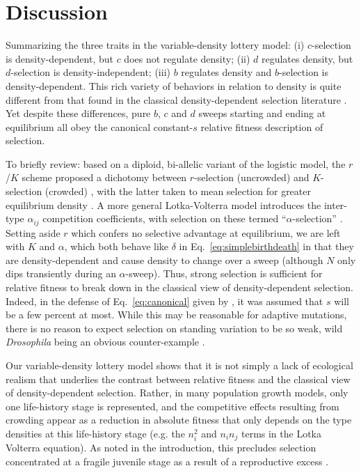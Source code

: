 \documentclass[12pt]{article}
\begin{document}
\section*{Discussion}


Summarizing the three traits in the variable-density lottery model: (i) $c$-selection is density-dependent, but $c$ does not regulate density; (ii) $d$ regulates density, but $d$-selection is density-independent; (iii) $b$ regulates density and $b$-selection is density-dependent. This rich variety of behaviors in relation to density is quite different from that found in the classical density-dependent selection literature \citep{roughgarden_1979,christiansen_2004}. Yet despite these differences, pure $b$, $c$ and $d$ sweeps starting and ending at equilibrium all obey the canonical constant-$s$ relative fitness description of selection.  

To briefly review: based on a diploid, bi-allelic variant of the logistic model, the $r$/$K$ scheme proposed a dichotomy between $r$-selection (uncrowded) and $K$-selection (crowded) \citep{macarthur_1962}, with the latter taken to mean selection for greater equilibrium density \citep{gill_1974}. A more general Lotka-Volterra model introduces the inter-type $\alpha_{ij}$ competition coefficients, with selection on these termed ``$\alpha$-selection'' \citep{gill_1974,joshi_2001}. Setting aside $r$ which confers no selective advantage at equilibrium, we are left with $K$ and $\alpha$, which both behave like $\delta$ in Eq.~\eqref{eq:simplebirthdeath} in that they are density-dependent and cause density to change over a sweep (although $N$ only dips transiently during an $\alpha$-sweep). Thus, strong selection is sufficient for relative fitness to break down in the classical view of density-dependent selection. Indeed, in the defense of Eq.~\eqref{eq:canonical} given by \cite{kimura1969natural}, it was assumed that $s$ will be a few percent at most. While this may be reasonable for adaptive mutations, there is no reason to expect selection on standing variation to be so weak, wild \textit{Drosophila} being an obvious counter-example \citep{bergland_14}.

Our variable-density lottery model shows that it is not simply a lack of ecological realism that underlies the contrast between relative fitness and the classical view of density-dependent selection. Rather, in many population growth models, only one life-history stage is represented, and the competitive effects resulting from crowding appear as a reduction in absolute fitness that only depends on the type densities at this life-history stage (e.g. the $n_i^2$ and $n_in_j$ terms in the Lotka Volterra equation). As noted in the introduction, this precludes selection concentrated at a fragile juvenile stage as a result of a reproductive excess \citep{chesson_1983,turner1968population,kimura1969natural,nei1971fertility}. 
\end{document}
